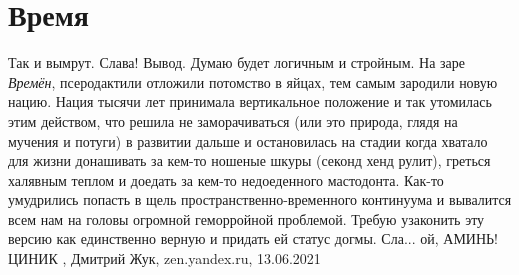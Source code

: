  
 
 
 
 
\chapter{Время}

Так и вымрут. Слава!  Вывод. Думаю будет логичным и стройным. На заре
\emph{Времён}, псеродактили отложили потомство в яйцах, тем самым зародили
новую нацию. Нация тысячи лет принимала вертикальное положение и так утомилась
этим действом, что решила не заморачиваться (или это природа, глядя на мучения
и потуги) в развитии дальше и остановилась на стадии когда хватало для жизни
донашивать за кем-то ношеные шкуры (секонд хенд рулит), греться халявным теплом
и доедать за кем-то недоеденного мастодонта. Как-то умудрились попасть в щель
пространственно-временного континуума и вывалится всем нам на головы огромной
геморройной проблемой. Требую узаконить эту версию как единственно верную и
придать ей статус догмы. Сла... ой, АМИНЬ! ЦИНИК
, 
Дмитрий Жук, zen.yandex.ru, 13.06.2021 

